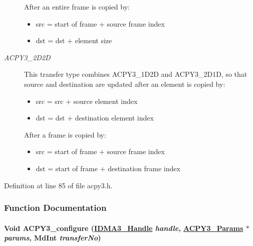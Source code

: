\begin{Desc}
\begin{description}
After an entire frame is copied by:\begin{itemize}
\item src = start of frame + source frame index\item dst = dst + element size \end{itemize}
\item[{\em 
\hypertarget{group___d_s_p_a_c_p_y3_ggbe2d02fcbde983c823b138f20667cbfcd8ac84d79831cfe53a4088a321989a85}{
ACPY3\_\-2D2D}
\label{group___d_s_p_a_c_p_y3_ggbe2d02fcbde983c823b138f20667cbfcd8ac84d79831cfe53a4088a321989a85}
}]This transfer type combines ACPY3\_\-1D2D and ACPY3\_\-2D1D, so that source and destination are updated after an element is copied by:\begin{itemize}
\item src = src + source element index\item dst = dst + destination element index\end{itemize}


After a frame is copied by:\begin{itemize}
\item src = start of frame + source frame index\item dst = start of frame + destination frame index \end{itemize}
\end{description}
\end{Desc}



Definition at line 85 of file acpy3.h.

\subsubsection{Function Documentation}
\hypertarget{group___d_s_p_a_c_p_y3_g427e8e4fd5c445b2f9bb5d971c06c099}{
\paragraph[ACPY3\_\-configure]{\setlength{\rightskip}{0pt plus 5cm}Void ACPY3\_\-configure (\hyperlink{struct_i_d_m_a3___obj}{IDMA3\_\-Handle} {\em handle}, \hyperlink{struct_a_c_p_y3___params}{ACPY3\_\-Params} $\ast$ {\em params}, Md\-Int {\em transfer\-No})}\hfill}
\label{group___d_s_p_a_c_p_y3_g427e8e4fd5c445b2f9bb5d971c06c099}


